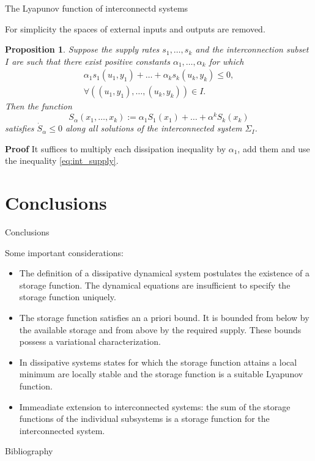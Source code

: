 \documentclass[aspectratio=169]{beamer}
\newtheorem{proposition}{Proposition}
\begin{document}
\begin{frame}{The Lyapunov function of interconnectd systems}
	
	For simplicity the spaces of external inputs and outputs are removed.	
	\begin{proposition}
		Suppose the supply rates $s_1, \dots, s_k$ and the interconnection subset $I$ are such that there exist positive constants $\alpha_1, \dots, \alpha_k$ for which
		\begin{equation}\label{eq:int_supply}
			\begin{aligned}
				\alpha_1 s_1 (u_1, y_1) + \dots + \alpha_k s_k(u_k , y_k) \le 0, \\
				\forall ((u_1 , y_1 ), \dots, (u_k , y_k)) \in I.
			\end{aligned}
		\end{equation}
	Then the function
	\begin{equation*}
		S_\alpha(x_1 , \dots, x_k) := \alpha_1 S_1(x_1) + \dots + \alpha^k S_k(x_k)
	\end{equation*}
	satisfies $\dot{S}_\alpha \le 0$ along all solutions of the interconnected system $\Sigma_I$.
	\end{proposition}
	\textbf{Proof} It suffices to multiply each dissipation inequality by  $\alpha_1$, add them and use the inequality \eqref{eq:int_supply}.
\end{frame}

\section{Conclusions}


\begin{frame}{Conclusions}
	
	Some important considerations:
	\begin{itemize}
		\item The definition of a dissipative dynamical system postulates the existence of a
		storage function. The dynamical equations are insufficient to specify the storage function uniquely.
		\item  The storage function satisfies an a priori bound. It is bounded from below by the available storage and from above by the required supply. These bounds possess a variational characterization.
		\item In dissipative systems states for which the storage function attains a local minimum are
		locally stable and the storage function is a suitable Lyapunov function.
		\item Immeadiate extension to interconnected systems: the sum of the
		storage functions of the individual subsystems is a storage function for
		the interconnected system.
	\end{itemize}

	
\end{frame}

\begin{frame}{Bibliography}
	\nocite{*}
	\printbibliography
\end{frame}

\appendix



	
\end{document}
